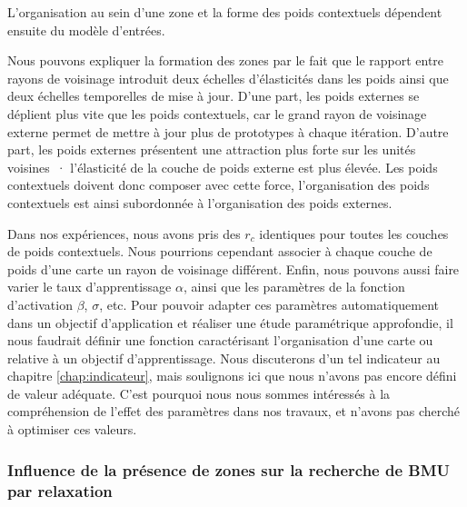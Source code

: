 \documentclass[../main]{subfiles}
\begin{document}
L'organisation au sein d'une zone et la forme des poids contextuels dépendent ensuite du modèle d'entrées.

Nous pouvons expliquer la formation des zones par le fait que le rapport entre rayons de voisinage introduit deux échelles d'élasticités dans les poids ainsi que deux échelles temporelles de mise à jour.
D'une part, les poids externes se déplient plus vite que les poids contextuels, car le grand rayon de voisinage externe permet de mettre à jour plus de prototypes à chaque itération.
D'autre part, les poids externes présentent une \og attraction \fg{} plus forte sur les unités voisines~· l'élasticité de la couche de poids externe est plus élevée.
Les poids contextuels doivent donc composer avec cette force, l'organisation des poids contextuels est ainsi subordonnée à l'organisation des poids externes.

Dans nos expériences, nous avons pris des $r_c$ identiques pour toutes les couches de poids contextuels.
Nous pourrions cependant associer à chaque couche de poids d'une carte un rayon de voisinage différent. 
Enfin, nous pouvons aussi faire varier le taux d'apprentissage $\alpha$, ainsi que les paramètres de la fonction d'activation $\beta$, $\sigma$, etc.
Pour pouvoir adapter ces paramètres automatiquement dans un objectif d'application et réaliser une étude paramétrique approfondie, il nous faudrait définir une fonction caractérisant l'organisation d'une carte ou relative à un objectif d'apprentissage. 
Nous discuterons d'un tel indicateur au chapitre \ref{chap:indicateur}, mais soulignons ici que nous n'avons pas encore défini de valeur adéquate. C'est pourquoi nous nous sommes intéressés à la compréhension de l'effet des paramètres dans nos travaux, et n'avons pas cherché à optimiser ces valeurs.

\subsubsection{Influence de la présence de zones sur la recherche de BMU par relaxation}
\end{document}
